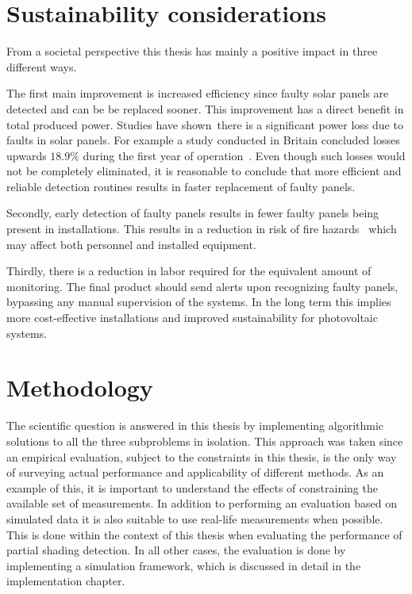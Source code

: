 \section{Sustainability considerations}
From a societal perspective this thesis has mainly a positive impact in three different ways.

The first main improvement is increased efficiency since faulty solar panels are detected and can be be replaced sooner.
This improvement has a direct benefit in total produced power.
Studies have shown there is a significant power loss due to faults in solar panels.
For example a study conducted in Britain concluded losses upwards $18.9\%$ during the first year of operation~\cite{Firth2010}.
Even though such losses would not be completely eliminated, it is reasonable to conclude that more efficient and reliable detection routines results in faster replacement of faulty panels.

Secondly, early detection of faulty panels results in fewer faulty panels being present in installations.
This results in a reduction in risk of fire hazards~\cite{Zhao2010night} which may affect both personnel and installed equipment.

Thirdly, there is a reduction in labor required for the equivalent amount of monitoring.
The final product should send alerts upon recognizing faulty panels, bypassing any manual supervision of the systems.
In the long term this implies more cost-effective installations and improved sustainability for photovoltaic systems.

\section{Methodology}
The scientific question is answered in this thesis by implementing algorithmic solutions to all the three subproblems in isolation.
This approach was taken since an empirical evaluation, subject to the constraints in this thesis, is the only way of surveying actual performance and applicability of different methods.
As an example of this, it is important to understand the effects of constraining the available set of measurements.
In addition to performing an evaluation based on simulated data it is also suitable to use real-life measurements when possible.
This is done within the context of this thesis when evaluating the performance of partial shading detection.
In all other cases, the evaluation is done by implementing a simulation framework, which is discussed in detail in the implementation chapter.


